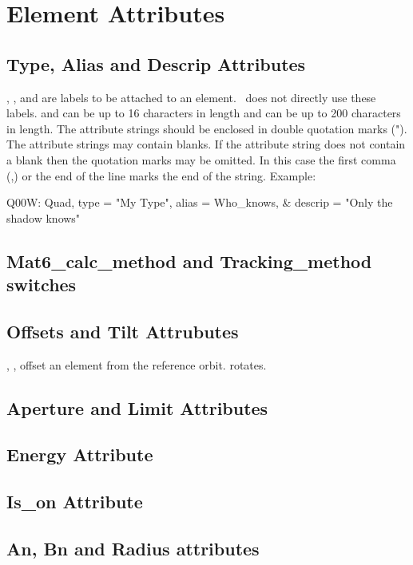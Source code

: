 \chapter {Element Attributes}

\section{Type, Alias and Descrip Attributes}
\label{s:string}

, , and  are labels to be attached 
to an element. \bmad\ does not directly use these labels. 
and  can be up to 16 characters in length and 
can be up to 200 characters in length. The attribute strings should be
enclosed in double quotation marks ("). The attribute strings may
contain blanks. If the attribute string does not contain a blank then
the quotation marks may be omitted. In this case the first comma (,)
or the end of the line marks the end of the string. Example:
\begin{example}
  Q00W: Quad, type = "My Type", alias = Who_knows, &
                                        descrip = "Only the shadow knows"
\end{example}

\section{Mat6\_calc\_method and Tracking\_method switches}
\label{s:track}


\section{Offsets and Tilt Attrubutes}
\label{s:offset}

, ,  offset an element from the reference orbit.
 rotates.

\section{Aperture and Limit Attributes}
\label{s:limit}

\section{Energy Attribute}
\label{s:energy}

\section{Is\_on Attribute}
\label{s:is_on}

\section{An, Bn and Radius attributes}
\label{s:ab}

